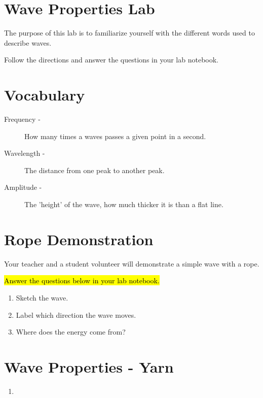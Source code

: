 \documentclass[14pt, fleqn, paper=letter, oneside]{scrartcl}
\begin{document}
\section*{Wave Properties Lab}
The purpose of this lab is to familiarize yourself with the different words used to describe waves.

Follow the directions and answer the questions in your lab notebook.

\section*{Vocabulary}
\begin{description}
\item[Frequency -] How many times a waves passes a given point in a second.

\item[Wavelength -] The distance from one peak to another peak.

\item[Amplitude -] The 'height' of the wave, how much thicker it is than a flat line.

\end{description}


\section{Rope Demonstration}
Your teacher and a student volunteer will demonstrate a simple wave with a rope.

\hl{Answer the questions below in your lab notebook.}
\begin{enumerate}
\item Sketch the wave.
\item Label which direction the wave moves.
\item Where does the energy come from?
\end{enumerate}

\section{Wave Properties - Yarn}

\begin{enumerate}[resume]
\item 
\end{enumerate}
\end{document}
